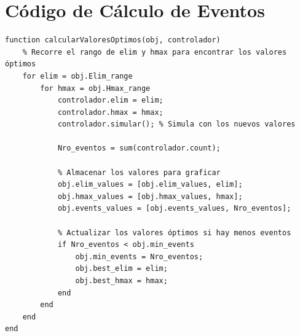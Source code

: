 \documentclass[conference]{IEEEtran}
\begin{document}
\section{C\'odigo de C\'alculo de Eventos}
\begin{scriptsize}
\begin{verbatim}
function calcularValoresOptimos(obj, controlador)
    % Recorre el rango de elim y hmax para encontrar los valores óptimos
    for elim = obj.Elim_range
        for hmax = obj.Hmax_range
            controlador.elim = elim;
            controlador.hmax = hmax;
            controlador.simular(); % Simula con los nuevos valores
            
            Nro_eventos = sum(controlador.count);

            % Almacenar los valores para graficar
            obj.elim_values = [obj.elim_values, elim];
            obj.hmax_values = [obj.hmax_values, hmax];
            obj.events_values = [obj.events_values, Nro_eventos];

            % Actualizar los valores óptimos si hay menos eventos
            if Nro_eventos < obj.min_events
                obj.min_events = Nro_eventos;
                obj.best_elim = elim;
                obj.best_hmax = hmax;
            end
        end
    end
end
\end{verbatim}
\end{scriptsize}
\end{document}
